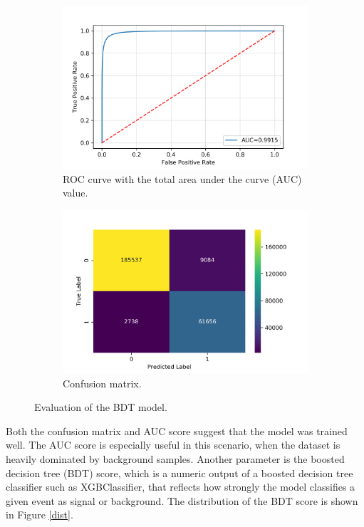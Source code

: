     \begin{figure}[H]
        \centering
        \begin{subfigure}[b]{0.49\linewidth}
            \centering
            \includegraphics[width=0.95\linewidth]{Figure/roc_curve.png}
            \caption{ROC curve with the total area under the curve (AUC) value.}
            \label{roc_curve}
        \end{subfigure}
        \hfill
        \begin{subfigure}[b]{0.49\linewidth}
            \centering
            \includegraphics[width=0.95\linewidth]{Figure/confusion_matrix.png}
            \caption{Confusion matrix.}
            \label{confusion_matrix}
        \end{subfigure}
        \caption{Evaluation of the BDT model.}
    \end{figure}
    Both the confusion matrix and AUC score suggest that the model was trained well. The AUC score is especially useful in this scenario, when the dataset is heavily dominated by background samples. Another parameter is the boosted decision tree (BDT) score, which is a numeric output of a boosted decision tree classifier such as XGBClassifier, that reflects how strongly the model classifies a given event as signal or background. The distribution of the BDT score is shown in Figure \ref{dist}.\\
    
